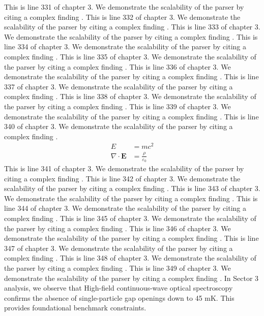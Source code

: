 This is line 331 of chapter 3. We demonstrate the scalability of the parser by citing a complex finding \cite{ref3_331}.
This is line 332 of chapter 3. We demonstrate the scalability of the parser by citing a complex finding \cite{ref3_332}.
This is line 333 of chapter 3. We demonstrate the scalability of the parser by citing a complex finding \cite{ref3_333}.
This is line 334 of chapter 3. We demonstrate the scalability of the parser by citing a complex finding \cite{ref3_334}.
This is line 335 of chapter 3. We demonstrate the scalability of the parser by citing a complex finding \cite{ref3_335}.
This is line 336 of chapter 3. We demonstrate the scalability of the parser by citing a complex finding \cite{ref3_336}.
This is line 337 of chapter 3. We demonstrate the scalability of the parser by citing a complex finding \cite{ref3_337}.
This is line 338 of chapter 3. We demonstrate the scalability of the parser by citing a complex finding \cite{ref3_338}.
This is line 339 of chapter 3. We demonstrate the scalability of the parser by citing a complex finding \cite{ref3_339}.
This is line 340 of chapter 3. We demonstrate the scalability of the parser by citing a complex finding \cite{ref3_340}.
\begin{align*}
  E &= mc^2 \\
  \nabla \cdot \mathbf{E} &= \frac{\rho}{\varepsilon_0}
\end{align*}
This is line 341 of chapter 3. We demonstrate the scalability of the parser by citing a complex finding \cite{ref3_341}.
This is line 342 of chapter 3. We demonstrate the scalability of the parser by citing a complex finding \cite{ref3_342}.
This is line 343 of chapter 3. We demonstrate the scalability of the parser by citing a complex finding \cite{ref3_343}.
This is line 344 of chapter 3. We demonstrate the scalability of the parser by citing a complex finding \cite{ref3_344}.
This is line 345 of chapter 3. We demonstrate the scalability of the parser by citing a complex finding \cite{ref3_345}.
This is line 346 of chapter 3. We demonstrate the scalability of the parser by citing a complex finding \cite{ref3_346}.
This is line 347 of chapter 3. We demonstrate the scalability of the parser by citing a complex finding \cite{ref3_347}.
This is line 348 of chapter 3. We demonstrate the scalability of the parser by citing a complex finding \cite{ref3_348}.
This is line 349 of chapter 3. We demonstrate the scalability of the parser by citing a complex finding \cite{ref3_349}.
In Sector 3 analysis, we observe that High-field continuous-wave optical spectroscopy confirms the absence of single-particle gap openings down to 45 mK. This provides foundational benchmark constraints.
